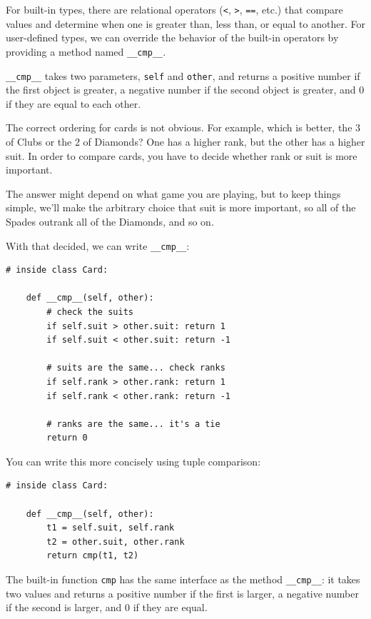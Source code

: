 \documentclass[10pt]{book}
\begin{document}
For built-in types, there are relational operators
({\tt <}, {\tt >}, {\tt ==}, etc.)
that compare
values and determine when one is greater than, less than, or equal to
another.  For user-defined types, we can override the behavior of
the built-in operators by providing a method named
\verb"__cmp__".  

\verb"__cmp__" takes two parameters, {\tt self} and {\tt other},
and returns a positive number if the first object is greater, a
negative number if the second object is greater, and 0 if they are
equal to each other.

The correct ordering for cards is not obvious.
For example, which
is better, the 3 of Clubs or the 2 of Diamonds?  One has a higher
rank, but the other has a higher suit.  In order to compare
cards, you have to decide whether rank or suit is more important.

The answer might depend on what game you are playing, but to keep
things simple, we'll make the arbitrary choice that suit is more
important, so all of the Spades outrank all of the Diamonds,
and so on.

With that decided, we can write \verb"__cmp__":

\begin{verbatim}
# inside class Card:

    def __cmp__(self, other):
        # check the suits
        if self.suit > other.suit: return 1
        if self.suit < other.suit: return -1

        # suits are the same... check ranks
        if self.rank > other.rank: return 1
        if self.rank < other.rank: return -1

        # ranks are the same... it's a tie
        return 0    
\end{verbatim}
%
You can write this more concisely using tuple comparison:

\begin{verbatim}
# inside class Card:

    def __cmp__(self, other):
        t1 = self.suit, self.rank
        t2 = other.suit, other.rank
        return cmp(t1, t2)
\end{verbatim}
%
The built-in function {\tt cmp} has the same interface as
the method \verb"__cmp__": it takes two values and returns
a positive number if the first is larger, a negative number
if the second is larger, and 0 if they are equal.
\end{document}
